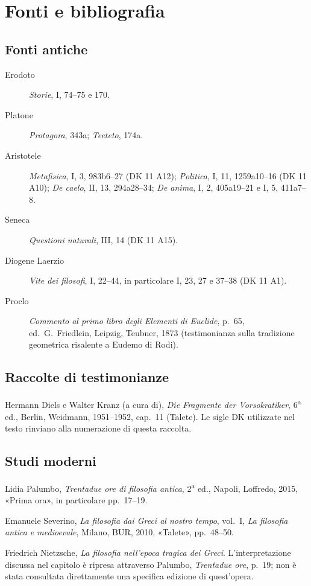 \chapter{Fonti e bibliografia}

\section*{Fonti antiche}

\begin{description}
  \item[Erodoto] \emph{Storie}, I, 74--75 e 170.
  \item[Platone] \emph{Protagora}, 343a; \emph{Teeteto}, 174a.
  \item[Aristotele] \emph{Metafisica}, I, 3, 983b6--27 (DK 11 A12);
    \emph{Politica}, I, 11, 1259a10--16 (DK 11 A10);
    \emph{De caelo}, II, 13, 294a28--34;
    \emph{De anima}, I, 2, 405a19--21 e I, 5, 411a7--8.
  \item[Seneca] \emph{Questioni naturali}, III, 14 (DK 11 A15).
  \item[Diogene Laerzio] \emph{Vite dei filosofi}, I, 22--44, in particolare
    I, 23, 27 e 37--38 (DK 11 A1).
  \item[Proclo] \emph{Commento al primo libro degli Elementi di Euclide},
    p.~65, ed.\ G.~Friedlein, Leipzig, Teubner, 1873
    (testimonianza sulla tradizione geometrica risalente a Eudemo di Rodi).
\end{description}

\section*{Raccolte di testimonianze}

Hermann Diels e Walter Kranz (a cura di), \emph{Die Fragmente der Vorsokratiker},
6\textsuperscript{a} ed., Berlin, Weidmann, 1951--1952, cap.~11 (Talete).
Le sigle DK utilizzate nel testo rinviano alla numerazione di questa raccolta.

\section*{Studi moderni}

Lidia Palumbo, \emph{Trentadue ore di filosofia antica},
2\textsuperscript{a} ed., Napoli, Loffredo, 2015,
«Prima ora», in particolare pp.~17--19.

Emanuele Severino, \emph{La filosofia dai Greci al nostro tempo},
vol.~I, \emph{La filosofia antica e medioevale},
Milano, BUR, 2010, «Talete», pp.~48--50.

Friedrich Nietzsche, \emph{La filosofia nell'epoca tragica dei Greci}.
L'interpretazione discussa nel capitolo è ripresa attraverso
Palumbo, \emph{Trentadue ore}, p.~19; non è stata consultata
direttamente una specifica edizione di quest'opera.
